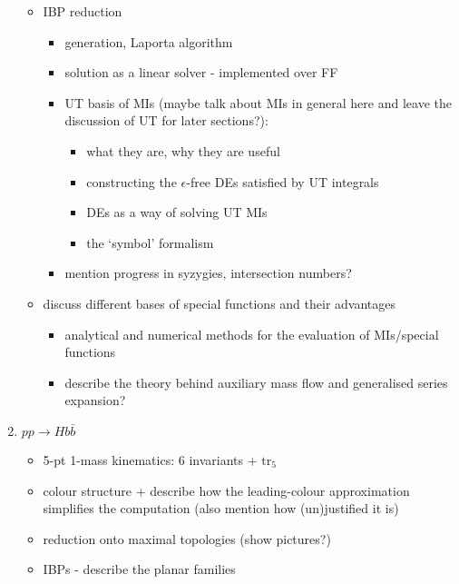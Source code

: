 \documentclass[main.tex]{subfiles}
\begin{document}
\begin{enumerate}
\begin{itemize}
        \item IBP reduction
        \begin{itemize}
            \item generation, Laporta algorithm
            \item solution as a linear solver - implemented over FF
            \item UT basis of MIs (maybe talk about MIs in general here and leave the discussion of UT for later sections?):
            \begin{itemize}
                \item what they are, why they are useful
                \item constructing the $\epsilon$-free DEs satisfied by UT integrals\
                \item DEs as a way of solving UT MIs
                \item the `symbol' formalism
            \end{itemize}
            
            \item mention progress in syzygies, intersection numbers?
        \end{itemize}
        
        \item discuss different bases of special functions and their advantages
        \begin{itemize}
            \item analytical and numerical methods for the evaluation of MIs/special functions
            \item describe the theory behind auxiliary mass flow and generalised series expansion?
        \end{itemize}
    \end{itemize}
    
    \item $pp \rightarrow Hb\bar{b}$
    \begin{itemize}
        \item 5-pt 1-mass kinematics: 6 invariants + $\mathrm{tr}_5$
        \item colour structure + describe how the leading-colour approximation simplifies the computation (also mention how (un)justified it is)
        \item reduction onto maximal topologies (show pictures?)
        \item IBPs - describe the planar families


\end{itemize}
\end{enumerate}
\end{document}
